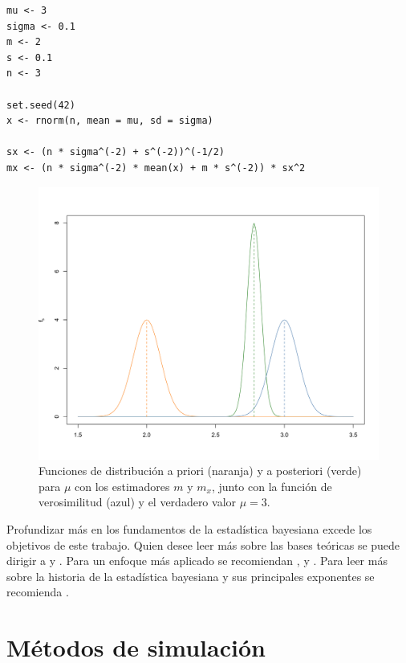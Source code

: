 \documentclass[11pt,a4paper]{article}
\begin{document}
\begin{lstlisting}
mu <- 3
sigma <- 0.1
m <- 2
s <- 0.1
n <- 3

set.seed(42)
x <- rnorm(n, mean = mu, sd = sigma)

sx <- (n * sigma^(-2) + s^(-2))^(-1/2)
mx <- (n * sigma^(-2) * mean(x) + m * s^(-2)) * sx^2
\end{lstlisting}

\begin{figure}[h]
\centering\includegraphics[width=12cm]{pointwise_estimation.png}
\caption{Funciones de distribución a priori (naranja) y a posteriori (verde) para $\mu$ con los estimadores $m$ y $m_x$, junto con la función de verosimilitud (azul) y el verdadero valor $\mu = 3$.}
\label{fig:pointwise}
\end{figure}

Profundizar más en los fundamentos de la estadística bayesiana excede los objetivos de este trabajo. Quien desee leer más sobre las bases teóricas se puede dirigir a \citet{bernardo} y \citet{mendoza}. Para un enfoque más aplicado se recomiendan \citet{gelman}, \citet{kruschke} y \citet{albert}. Para leer más sobre la historia de la estadística bayesiana y sus principales exponentes se recomienda \citet{bertsch}.

\newpage

\section{Métodos de simulación}
\label{simulacion}
\end{document}
